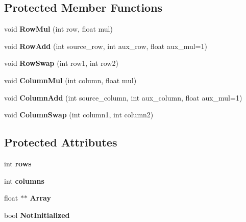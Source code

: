 \subsection*{Protected Member Functions}
\begin{DoxyCompactItemize}
\item 
\hypertarget{classdl32_matrix_a82d974dab72b180c93d70c546ef6bc12}{void {\bfseries Row\-Mul} (int row, float mul)}\label{classdl32_matrix_a82d974dab72b180c93d70c546ef6bc12}

\item 
\hypertarget{classdl32_matrix_a53ffc842dca28993f661ab0d3a52ad75}{void {\bfseries Row\-Add} (int source\-\_\-row, int aux\-\_\-row, float aux\-\_\-mul=1)}\label{classdl32_matrix_a53ffc842dca28993f661ab0d3a52ad75}

\item 
\hypertarget{classdl32_matrix_a2480df183766924cee896ad7b367333d}{void {\bfseries Row\-Swap} (int row1, int row2)}\label{classdl32_matrix_a2480df183766924cee896ad7b367333d}

\item 
\hypertarget{classdl32_matrix_a1e50d1d95925c278464149f1ac888a9c}{void {\bfseries Column\-Mul} (int column, float mul)}\label{classdl32_matrix_a1e50d1d95925c278464149f1ac888a9c}

\item 
\hypertarget{classdl32_matrix_a7e78a56968abf7657c4eb8018342de75}{void {\bfseries Column\-Add} (int source\-\_\-column, int aux\-\_\-column, float aux\-\_\-mul=1)}\label{classdl32_matrix_a7e78a56968abf7657c4eb8018342de75}

\item 
\hypertarget{classdl32_matrix_ae98c28d8e7dd61ee581df2807932e78d}{void {\bfseries Column\-Swap} (int column1, int column2)}\label{classdl32_matrix_ae98c28d8e7dd61ee581df2807932e78d}

\end{DoxyCompactItemize}
\subsection*{Protected Attributes}
\begin{DoxyCompactItemize}
\item 
\hypertarget{classdl32_matrix_a09692d9e9988267505756ab51f2cfe17}{int {\bfseries rows}}\label{classdl32_matrix_a09692d9e9988267505756ab51f2cfe17}

\item 
\hypertarget{classdl32_matrix_a36cb2edbaf4238f7ef7640c47f571652}{int {\bfseries columns}}\label{classdl32_matrix_a36cb2edbaf4238f7ef7640c47f571652}

\item 
\hypertarget{classdl32_matrix_a27ed6dbf5273974683b30e76327380e6}{float $\ast$$\ast$ {\bfseries Array}}\label{classdl32_matrix_a27ed6dbf5273974683b30e76327380e6}

\item 
\hypertarget{classdl32_matrix_a238874d8adcf135ca3d0edbfee9dca76}{bool {\bfseries Not\-Initialized}}\label{classdl32_matrix_a238874d8adcf135ca3d0edbfee9dca76}

\end{DoxyCompactItemize}


